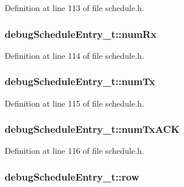 Definition at line 113 of file schedule.\+h.

\subsubsection[{\texorpdfstring{num\+Rx}{numRx}}]{ debug\+Schedule\+Entry\+\_\+t\+::num\+Rx}\hypertarget{structdebug_schedule_entry__t_a6b7c99777bf187ca7b2992a08aaaa109}{}\label{structdebug_schedule_entry__t_a6b7c99777bf187ca7b2992a08aaaa109}


Definition at line 114 of file schedule.\+h.

\subsubsection[{\texorpdfstring{num\+Tx}{numTx}}]{ debug\+Schedule\+Entry\+\_\+t\+::num\+Tx}\hypertarget{structdebug_schedule_entry__t_adc3fb28e735838c06b8a82014228ea74}{}\label{structdebug_schedule_entry__t_adc3fb28e735838c06b8a82014228ea74}


Definition at line 115 of file schedule.\+h.

\subsubsection[{\texorpdfstring{num\+Tx\+A\+CK}{numTxACK}}]{ debug\+Schedule\+Entry\+\_\+t\+::num\+Tx\+A\+CK}\hypertarget{structdebug_schedule_entry__t_a94b93c2b00124f9dd7dcc4615a648d84}{}\label{structdebug_schedule_entry__t_a94b93c2b00124f9dd7dcc4615a648d84}


Definition at line 116 of file schedule.\+h.

\subsubsection[{\texorpdfstring{row}{row}}]{ debug\+Schedule\+Entry\+\_\+t\+::row}\hypertarget{structdebug_schedule_entry__t_ab2b6485ce752b440885f88f5506c6d6e}{}\label{structdebug_schedule_entry__t_ab2b6485ce752b440885f88f5506c6d6e}


